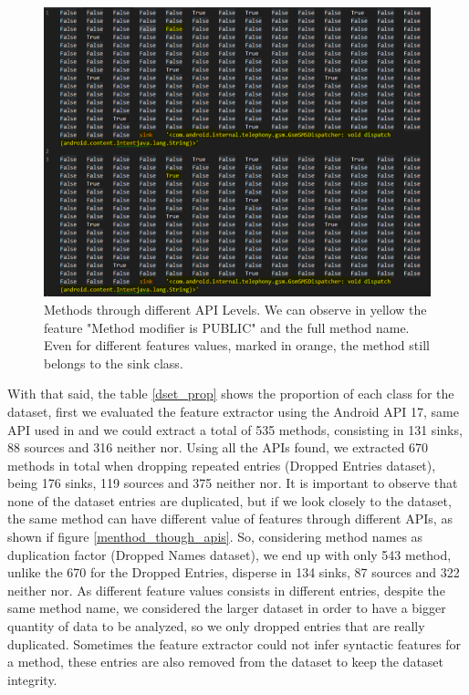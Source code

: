\begin{figure}[h!]
    \centering
    \renewcommand{\arraystretch}{1.8}
    \includegraphics[width=\linewidth]{images/menthod_though_apis.png}
    \caption{%
    Methods through different API Levels. We can observe in yellow the feature "Method modifier is PUBLIC" and the full method name. Even for different features values, marked in orange, the method still belongs to the sink class.%
    }
\end{figure}\label{menthod_though_apis}

With that said, the table \ref{dset_prop} shows the proportion of each class for the dataset, first we evaluated the feature extractor using the Android API 17, same API used in \cite{rasthofer2014machine} and we could extract a total of 535 methods, consisting in 131 sinks, 88 sources and 316 neither nor. Using all the APIs found, we extracted 670 methods in total when dropping repeated entries (Dropped Entries dataset), being 176 sinks, 119 sources and 375 neither nor. It is important to observe that none of the dataset entries are duplicated, but if we look closely to the dataset, the same method can have different value of features through different APIs, as shown if figure \ref{menthod_though_apis}. So, considering method names as duplication factor (Dropped Names dataset), we end up with only 543 method, unlike the 670 for the Dropped Entries, disperse in 134 sinks, 87 sources and 322 neither nor. As different feature values consists in different entries, despite the same method name, we considered the larger dataset in order to have a bigger quantity of data to be analyzed, so we only dropped entries that are really duplicated. Sometimes the feature extractor could not infer syntactic features for a method, these entries are also removed from the dataset to keep the dataset integrity.


